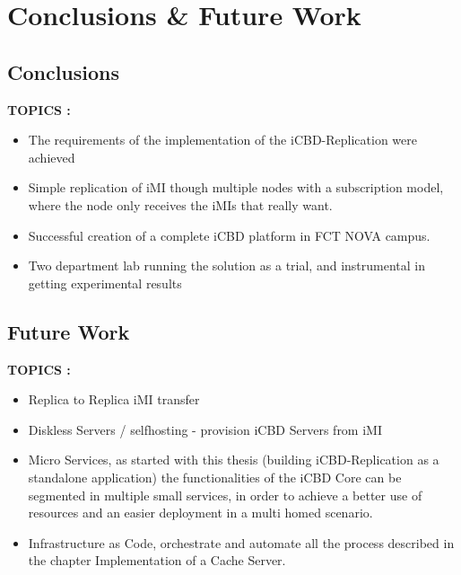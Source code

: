 \chapter{Conclusions \& Future Work}
\label{cha:conclusion}

\section{Conclusions}
\label{sec:con_conclusions}

\textbf{TOPICS :}
\begin{itemize}
	\item The requirements of the implementation of the iCBD-Replication were achieved 
	\item Simple replication of iMI though multiple nodes with a subscription model, where the node only receives the iMIs that really want.
	\item Successful creation of a complete iCBD platform in FCT NOVA campus.
	\item Two department lab running the solution as a trial, and instrumental in getting experimental results
\end{itemize}



\section{Future Work}
\label{sec:con_future_work}

\textbf{TOPICS :}
\begin{itemize}
	\item Replica to Replica iMI transfer
	\item Diskless Servers / selfhosting - provision iCBD Servers from iMI
	\item Micro Services, as started with this thesis (building iCBD-Replication as a standalone application) the functionalities of the iCBD Core can be segmented in multiple small services, in order to achieve a better use of resources and an easier deployment in a multi homed scenario.
	\item Infrastructure as Code, orchestrate and automate all the process described in the chapter Implementation of a Cache Server.
\end{itemize}




